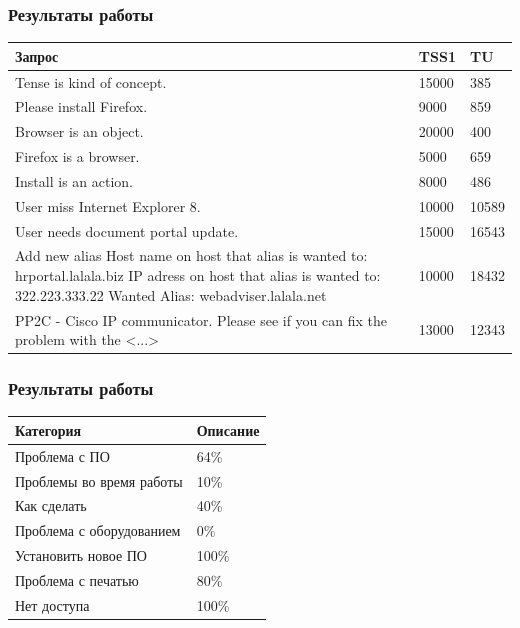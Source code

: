 \documentclass[14pt]{beamer}
\begin{document}
\begin{frame}
\frametitle{Результаты работы}
\begin{table}
	
\small
\begin{tabular} {|p{8cm}|p{1cm}|p{1cm}|}

\hline
\textbf{Запрос} & TSS1 & TU \\
\hline
  Tense is kind of concept. & 15000 & 385 \\
  
  \hline
  Please install Firefox.  & 9000 & 859 \\
  \hline
  Browser is an object.   & 20000 & 400 \\
  \hline
  Firefox is a browser.   & 5000 & 659  \\
  \hline
  Install is an action.    & 8000 & 486 \\
  \hline
  User miss Internet Explorer 8.     & 10000 & 10589 \\
  \hline
  User needs document portal update.    & 15000 & 16543 \\
  \hline
  Add new alias Host name on host that alias is wanted to: hrportal.lalala.biz IP adress on host that alias is wanted to: 322.223.333.22 Wanted Alias:    webadviser.lalala.net    & 10000 & 18432  \\ 
  \hline
  PP2C - Cisco IP communicator. Please see if you can fix the problem with the <...> & 13000 & 12343 \\ 
   \hline
   \end{tabular}
\end{table}
\end{frame}

\begin{frame}
\frametitle{Результаты работы}
\begin{table}
	
\small
\begin{tabular} {|p{8cm}|p{2cm}|}

\hline
\textbf{Категория} & \textbf{Описание} \\
\hline
 Проблема с ПО    & 64\% \\
 \hline Проблемы во время работы  &  10\% \\
  \hline Как сделать & 40\% \\
   \hline
Проблема с оборудованием  & 0\% \\
 \hline
Установить новое ПО       & 100\% \\
 \hline Проблема с печатью        & 80\% \\
  \hline Нет доступа               & 100\% \\
  \hline
   \end{tabular}
\end{table}

\end{frame}
\end{document}
